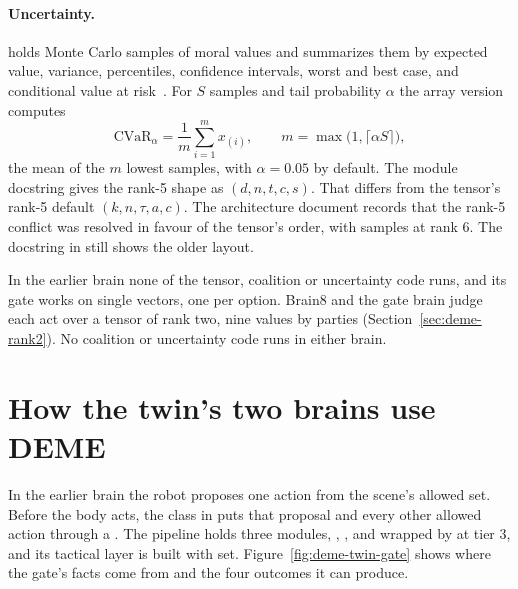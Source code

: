 \paragraph{Uncertainty.}  holds Monte Carlo samples of moral values and
summarizes them by expected value, variance, percentiles, confidence intervals, worst and best
case, and conditional value at risk~\cite{rockafellar2000cvar}. For $S$ samples and tail
probability $\alpha$ the array version computes
\begin{equation}
\mathrm{CVaR}_\alpha = \frac{1}{m}\sum_{i=1}^{m} x_{(i)},\qquad m = \max\bigl(1, \lceil \alpha S \rceil\bigr),
\label{eq:deme-cvar}
\end{equation}
the mean of the $m$ lowest samples, with $\alpha = 0.05$ by default. The module docstring gives
the rank-5 shape as $(d,n,t,c,s)$. That differs from the tensor's rank-5 default
$(k,n,\tau,a,c)$. The architecture document records that the rank-5 conflict was resolved in
favour of the tensor's order, with samples at rank 6. The docstring in 
still shows the older layout.

In the earlier brain none of the tensor, coalition or uncertainty code runs, and its gate works on
single vectors, one per option. Brain8 and the gate brain judge each act over a tensor of rank two,
nine values by parties (Section~\ref{sec:deme-rank2}). No coalition or uncertainty code runs in
either brain.

\section{How the twin's two brains use DEME}\label{sec:deme-twin}

In the earlier brain the robot proposes one action from the scene's allowed set. Before the body acts, the
class  in  puts that proposal and every other allowed
action through a . The pipeline holds three modules,
, , and  wrapped by
 at tier 3, and its tactical layer is built with  set.
Figure~\ref{fig:deme-twin-gate} shows where the gate's facts come from and the four outcomes it
can produce.


